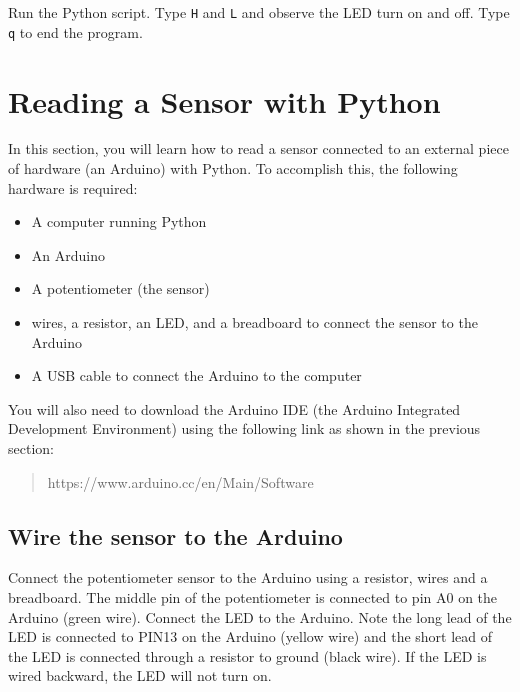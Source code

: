 \documentclass{book}
\providecommand{\tightlist}{%
      \setlength{\itemsep}{0pt}\setlength{\parskip}{0pt}}
\newcommand{\passthrough}[1]{#1}
\begin{document}
    
        Run the Python script. Type \passthrough{\lstinline!H!} and
\passthrough{\lstinline!L!} and observe the LED turn on and off. Type
\passthrough{\lstinline!q!} to end the program.
    




    
        \hypertarget{reading-a-sensor-with-python}{%
\section{Reading a Sensor with
Python}\label{reading-a-sensor-with-python}}
    




    
        In this section, you will learn how to read a sensor connected to an
external piece of hardware (an Arduino) with Python. To accomplish this,
the following hardware is required:

\begin{itemize}
\tightlist
\item
  A computer running Python
\item
  An Arduino
\item
  A potentiometer (the sensor)
\item
  wires, a resistor, an LED, and a breadboard to connect the sensor to
  the Arduino
\item
  A USB cable to connect the Arduino to the computer
\end{itemize}

You will also need to download the Arduino IDE (the Arduino Integrated
Development Environment) using the following link as shown in the
previous section:

\begin{quote}
https://www.arduino.cc/en/Main/Software
\end{quote}
    




    
        \hypertarget{wire-the-sensor-to-the-arduino}{%
\subsection{Wire the sensor to the
Arduino}\label{wire-the-sensor-to-the-arduino}}
    




    
        Connect the potentiometer sensor to the Arduino using a resistor, wires
and a breadboard. The middle pin of the potentiometer is connected to
pin A0 on the Arduino (green wire). Connect the LED to the Arduino. Note
the long lead of the LED is connected to PIN13 on the Arduino (yellow
wire) and the short lead of the LED is connected through a resistor to
ground (black wire). If the LED is wired backward, the LED will not turn
on.
\end{document}
